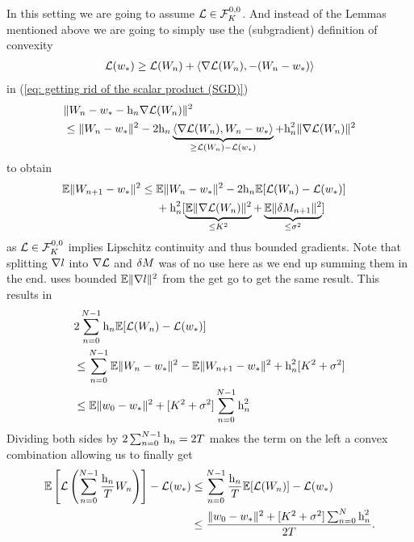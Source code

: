 In this setting we are going to assume \(\Loss \in \lipGradientSet[0,0]{\lipConst}\).
And instead of the Lemmas mentioned above we are going to simply use the
(subgradient) definition of convexity
\begin{align*}
	\Loss(\minimum)
	\ge \Loss(\Weights_n) + 
	\langle\nabla\Loss(\Weights_n), -(\Weights_n - \minimum)\rangle
\end{align*}
in (\ref{eq: getting rid of the scalar product (SGD)})
\begin{align*}
	&\|\Weights_n - \minimum - \lr_n\nabla\Loss(\Weights_n)\|^2\\
	&\le \|\Weights_n - \minimum\|^2
	- 2\lr_n\underbrace{\langle\nabla\Loss(\Weights_n), \Weights_n-\minimum\rangle}_{
		\ge \Loss(\Weights_n) - \Loss(\minimum)
	}
	+ \lr_n^2 \|\nabla\Loss(\Weights_n)\|^2
\end{align*}
to obtain
\begin{align*}
	\E\|\Weights_{n+1}-\minimum\|^2
	&\le
	\begin{aligned}[t]
		&\E\|\Weights_n -\minimum\|^2
		- 2\lr_n \E[\Loss(\Weights_n) - \Loss(\minimum)]\\
		&+ \lr_n^2 [
			\underbrace{\E\|\nabla\Loss(\Weights_n)\|^2}_{\le \lipConst^2}
			+ \underbrace{\E\|\martIncr_{n+1}\|^2}_{\le \stdBound^2}
		]
	\end{aligned}
\end{align*}
as \(\Loss\in\lipGradientSet[0,0]{\lipConst}\) implies Lipschitz continuity and thus bounded
gradients. Note that splitting \(\nabla\loss\) into \(\nabla\Loss\) and \(\martIncr\)
was of no use here as we end up summing them in the end. \textcite{nemirovskiRobustStochasticApproximation2009}
uses bounded \(\E\|\nabla\loss\|^2\) from the get go to get the same result.
This results in
\begin{align*}
	&2\sum_{n=0}^{N-1} \lr_n\E[\Loss(\Weights_n)-\Loss(\minimum)]\\
	&\le \sum_{n=0}^{N-1} \E\|\Weights_n -\minimum\|^2 - \E\|\Weights_{n+1}-\minimum\|^2
	+ \lr_n^2 [\lipConst^2 + \stdBound^2]\\
	&\le \E\|\weights_0 - \minimum\|^2 + [\lipConst^2+\stdBound^2]\sum_{n=0}^{N-1} \lr_n^2
\end{align*}
Dividing both sides by \(2\sum_{n=0}^{N-1}\lr_n=2T\) makes the term on the left a
convex combination allowing us to finally get 
\begin{align*}
	\E\left[\Loss\left(\sum_{n=0}^{N-1} \frac{\lr_n}{T}\Weights_n\right)\right]-\Loss(\minimum)
	&\le \sum_{n=0}^{N-1} \frac{\lr_n}{T}\E[\Loss(\Weights_n)]-\Loss(\minimum)\\
	&\le \frac{
		\|\weights_0 - \minimum\|^2 + [\lipConst^2+\stdBound^2]\sum_{n=0}^N \lr_n^2
	}{
		2T
	}.
\end{align*}
